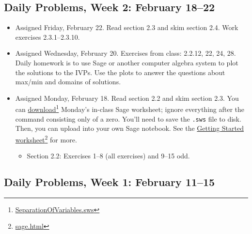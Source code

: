 \subsection{Daily Problems, Week 2: February 18--22}
\label{dailyproblemsweek2:february18--22}

\begin{itemize}
\item Assigned Friday, February 22. Read section 2.3 and skim section 2.4. Work exercises 2.3.1--2.3.10.

\item Assigned Wednesday, February 20. Exercises from class: 2.2.12, 22, 24, 28. Daily homework is to use Sage or another computer algebra system to plot the solutions to the IVPs. Use the plots to answer the questions about max\slash min and domains of solutions.

\item Assigned Monday, February 18. Read section 2.2 and skim section 2.3. You can \href{SeparationOfVariables.sws}{download}\footnote{\href{SeparationOfVariables.sws}{SeparationOfVariables.sws}} Monday's in-class Sage worksheet; ignore everything after the command consisting only of a zero. You'll need to save the \texttt{.sws} file to disk. Then, you can upload into your own Sage notebook. See the \href{sage.html}{Getting Started worksheet}\footnote{\href{sage.html}{sage.html}} for more.

\begin{itemize}
\item Section 2.2: Exercises 1--8 (all exercises) and 9--15 odd.

\end{itemize}

\end{itemize}

\subsection{Daily Problems, Week 1: February 11--15}
\label{dailyproblemsweek1:february11--15}

